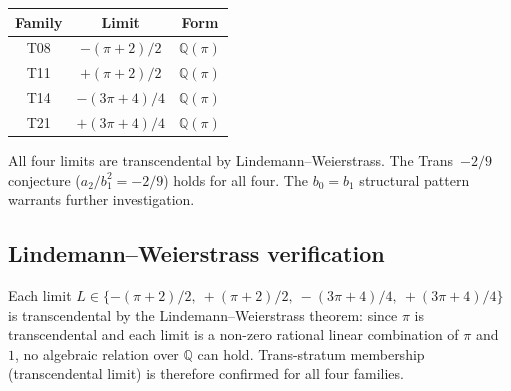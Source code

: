 \documentclass[11pt]{amsart}
\theoremstyle{definition}
\theoremstyle{remark}
\begin{document}
\begin{center}
\begin{tabular}{ccc}
\hline
Family & Limit & Form \\
\hline
T08 & $-(\pi+2)/2$  & $\mathbb{Q}(\pi)$ \\
T11 & $+(\pi+2)/2$  & $\mathbb{Q}(\pi)$ \\
T14 & $-(3\pi+4)/4$ & $\mathbb{Q}(\pi)$ \\
T21 & $+(3\pi+4)/4$ & $\mathbb{Q}(\pi)$ \\
\hline
\end{tabular}
\end{center}

All four limits are transcendental by Lindemann--Weierstrass.  The
Trans~$-2/9$ conjecture ($a_2/b_1^2 = -2/9$) holds for all four.  The
$b_0 = b_1$ structural pattern warrants further investigation.

\subsection*{Lindemann--Weierstrass verification}
Each limit
$L \in \{-(\pi+2)/2,\ +(\pi+2)/2,\ -(3\pi+4)/4,\ +(3\pi+4)/4\}$
is transcendental by the Lindemann--Weierstrass theorem: since
$\pi$ is transcendental and each limit is a non-zero rational
linear combination of $\pi$ and~$1$, no algebraic relation over
$\mathbb{Q}$ can hold.  Trans-stratum membership (transcendental
limit) is therefore confirmed for all four families.
\end{document}
